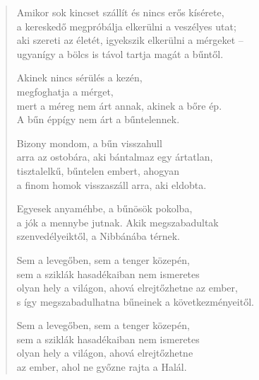 \begin{verse}
 Amikor sok kincset szállít és nincs erős kísérete,\\
a kereskedő megpróbálja elkerülni a veszélyes utat;\\
aki szereti az életét, igyekszik elkerülni a mérgeket –\\
ugyanígy a bölcs is távol tartja magát a bűntől.

 Akinek nincs sérülés a kezén,\\
megfoghatja a mérget,\\
mert a méreg nem árt annak, akinek a bőre ép.\\
A bűn éppígy nem árt a bűntelennek.

\newpage

 Bizony mondom, a bűn visszahull\\
arra az ostobára, aki bántalmaz egy ártatlan,\\
tisztalelkű, bűntelen embert, ahogyan\\
a finom homok visszaszáll arra, aki eldobta.

 Egyesek anyaméhbe, a bűnösök pokolba,\\
a jók a mennybe jutnak. Akik megszabadultak\\
szenvedélyeiktől, a Nibbánába térnek.

 Sem a levegőben, sem a tenger közepén,\\
sem a sziklák hasadékaiban nem ismeretes\\
olyan hely a világon, ahová elrejtőzhetne az ember,\\
s így megszabadulhatna bűneinek a következményeitől.

 Sem a levegőben, sem a tenger közepén,\\
sem a sziklák hasadékaiban nem ismeretes\\
olyan hely a világon, ahová elrejtőzhetne\\
az ember, ahol ne győzne rajta a Halál.

\end{verse}
